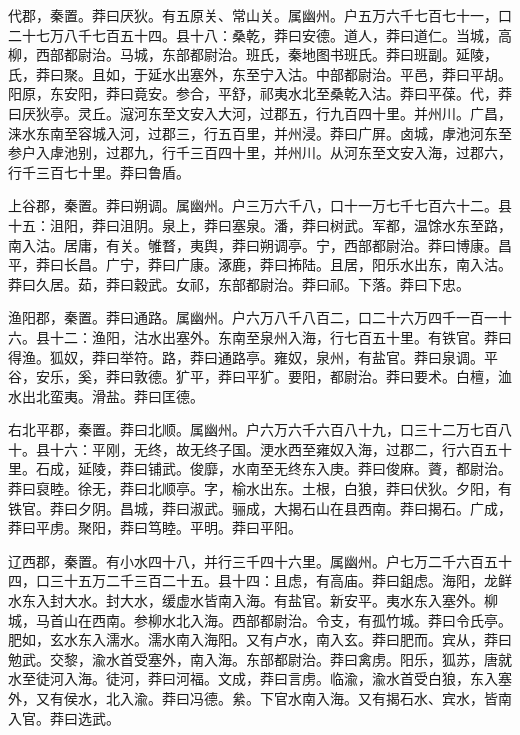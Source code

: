\documentclass[12pt,UTF8]{ctexbook}
\begin{document}
代郡，秦置。莽曰厌狄。有五原关、常山关。属幽州。户五万六千七百七十一，口二十七万八千七百五十四。县十八：桑乾，莽曰安德。道人，莽曰道仁。当城，高柳，西部都尉治。马城，东部都尉治。班氏，秦地图书班氏。莽曰班副。延陵，氏，莽曰聚。且如，于延水出塞外，东至宁入沽。中部都尉治。平邑，莽曰平胡。阳原，东安阳，莽曰竟安。参合，平舒，祁夷水北至桑乾入沽。莽曰平葆。代，莽曰厌狄亭。灵丘。滱河东至文安入大河，过郡五，行九百四十里。并州川。广昌，涞水东南至容城入河，过郡三，行五百里，并州浸。莽曰广屏。卤城，虖池河东至参户入虖池别，过郡九，行千三百四十里，并州川。从河东至文安入海，过郡六，行千三百七十里。莽曰鲁盾。



上谷郡，秦置。莽曰朔调。属幽州。户三万六千八，口十一万七千七百六十二。县十五：沮阳，莽曰沮阴。泉上，莽曰塞泉。潘，莽曰树武。军都，温馀水东至路，南入沽。居庸，有关。雊瞀，夷舆，莽曰朔调亭。宁，西部都尉治。莽曰博康。昌平，莽曰长昌。广宁，莽曰广康。涿鹿，莽曰抪陆。且居，阳乐水出东，南入沽。莽曰久居。茹，莽曰穀武。女祁，东部都尉治。莽曰祁。下落。莽曰下忠。



渔阳郡，秦置。莽曰通路。属幽州。户六万八千八百二，口二十六万四千一百一十六。县十二：渔阳，沽水出塞外。东南至泉州入海，行七百五十里。有铁官。莽曰得渔。狐奴，莽曰举符。路，莽曰通路亭。雍奴，泉州，有盐官。莽曰泉调。平谷，安乐，奚，莽曰敦德。犷平，莽曰平犷。要阳，都尉治。莽曰要术。白檀，洫水出北蛮夷。滑盐。莽曰匡德。



右北平郡，秦置。莽曰北顺。属幽州。户六万六千六百八十九，口三十二万七百八十。县十六：平刚，无终，故无终子国。浭水西至雍奴入海，过郡二，行六百五十里。石成，延陵，莽曰铺武。俊靡，水南至无终东入庚。莽曰俊麻。薋，都尉治。莽曰裒睦。徐无，莽曰北顺亭。字，榆水出东。土根，白狼，莽曰伏狄。夕阳，有铁官。莽曰夕阴。昌城，莽曰淑武。骊成，大揭石山在县西南。莽曰揭石。广成，莽曰平虏。聚阳，莽曰笃睦。平明。莽曰平阳。



辽西郡，秦置。有小水四十八，并行三千四十六里。属幽州。户七万二千六百五十四，口三十五万二千三百二十五。县十四：且虑，有高庙。莽曰鉏虑。海阳，龙鲜水东入封大水。封大水，缓虚水皆南入海。有盐官。新安平。夷水东入塞外。柳城，马首山在西南。参柳水北入海。西部都尉治。令支，有孤竹城。莽曰令氏亭。肥如，玄水东入濡水。濡水南入海阳。又有卢水，南入玄。莽曰肥而。宾从，莽曰勉武。交黎，渝水首受塞外，南入海。东部都尉治。莽曰禽虏。阳乐，狐苏，唐就水至徒河入海。徒河，莽曰河福。文成，莽曰言虏。临渝，渝水首受白狼，东入塞外，又有侯水，北入渝。莽曰冯德。絫。下官水南入海。又有揭石水、宾水，皆南入官。莽曰选武。
\end{document}
